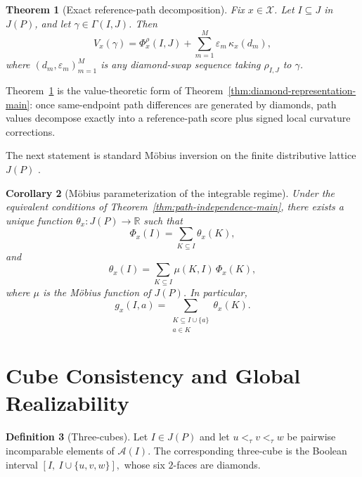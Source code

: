 \documentclass{article}
\newtheorem{theorem}{Theorem}[section]
\newtheorem{corollary}[theorem]{Corollary}
\theoremstyle{definition}
\newtheorem{definition}[theorem]{Definition}
\newcommand{\RR}{\mathbb R}
\begin{document}
\begin{theorem}[Exact reference-path decomposition]
\label{thm:reference-decomposition-main}
Fix \(x\in\mathcal X\). Let \(I\subseteq J\) in \(J(P)\), and let \(\gamma\in \Gamma(I,J)\). Then
\begin{equation}
\textstyle V_x(\gamma)
=
\Phi_x^\rho(I,J)
+
\sum_{m=1}^M \varepsilon_m\,\kappa_x(d_m),
\label{eq:reference-path-decomposition}
\end{equation}
where \((d_m,\varepsilon_m)_{m=1}^M\) is any diamond-swap sequence taking \(\rho_{I,J}\) to \(\gamma\).
\end{theorem}

Theorem~\ref{thm:reference-decomposition-main} is the value-theoretic form of Theorem~\ref{thm:diamond-representation-main}: once same-endpoint path differences are generated by diamonds, path values decompose exactly into a reference-path score plus signed local curvature corrections.

The next statement is standard M\"obius inversion on the finite distributive lattice \(J(P)\) \cite{rota1964,stanley2011ec1}.

\begin{corollary}[M\"obius parameterization of the integrable regime]
\label{cor:mobius-main}
Under the equivalent conditions of Theorem~\ref{thm:path-independence-main}, there exists a unique function \(\theta_x:J(P)\to\RR\) such that
\begin{equation}
\textstyle \Phi_x(I)=\sum_{K\subseteq I}\theta_x(K),
\label{eq:mobius-forward}
\end{equation}
and
\begin{equation}
\textstyle \theta_x(I)=\sum_{K\subseteq I}\mu(K,I)\,\Phi_x(K),
\label{eq:mobius-inverse}
\end{equation}
where \(\mu\) is the M\"obius function of \(J(P)\). In particular,
\begin{equation}
\textstyle g_x(I,a)=\sum_{\substack{K\subseteq I\cup\{a\}\\ a\in K}} \theta_x(K).
\label{eq:mobius-edge}
\end{equation}
\end{corollary}

\section{Cube Consistency and Global Realizability}
\label{sec:integrability}

\begin{definition}[Three-cubes]
Let \(I\in J(P)\) and let
$
u<_{\tau}v<_{\tau}w
$
be pairwise incomparable elements of \(\mathcal A(I)\). The corresponding {three-cube} is the Boolean interval
$
[I,\ I\cup\{u,v,w\}],
$
whose six \(2\)-faces are diamonds.
\end{definition}
\end{document}
